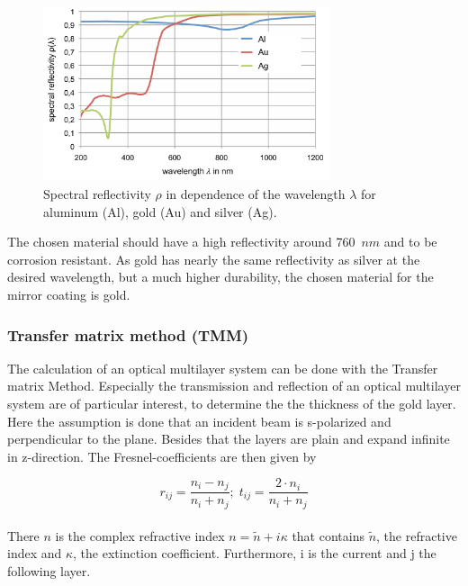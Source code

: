 \begin{figure}[H]
	\centering
	\includegraphics[width = 0.75\textwidth, height=0.3\textheight]{05_OUSD/images/coatingMat.png}
	\caption{Spectral reflectivity $\rho$ in dependence of the wavelength $\lambda$ for aluminum (Al), gold (Au) and silver (Ag).  \cite{bauelOptik}}
	\label{fig:CoatingMat}
\end{figure}

The chosen material should have a high reflectivity around 760~$nm$ and to be corrosion resistant. As gold has nearly the same reflectivity as silver at the desired wavelength, but a much higher durability, the chosen material for the mirror coating is gold. 

\subsubsection{Transfer matrix method (TMM)}

The calculation of an optical multilayer system can be done with the Transfer matrix Method. Especially the transmission and reflection of an optical multilayer system are of particular interest, to determine the the thickness of the gold layer. \\
Here the assumption is done that an incident beam is s-polarized and perpendicular to the plane. Besides that the layers are plain and expand infinite in z-direction. 
The Fresnel-coefficients are then given by

\begin{equation}
r_{ij} = \frac{n_i - n_j}{n_i + n_j};\; t_{ij} = \frac{2 \cdot n_i}{n_i + n_j}
\label{eq:r&t}
\end{equation}
\\
There $n$ is the complex refractive index $n = \tilde{n} + i \kappa$ that contains $\tilde{n}$, the refractive index and $\kappa$, the extinction coefficient. Furthermore, i is the current and j the following layer. 

